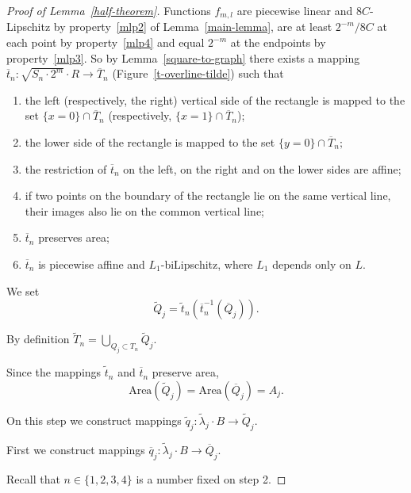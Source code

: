 \documentclass[12pt]{article}
\theoremstyle{definition}
\begin{document}
\begin{proof}[Proof of Lemma~\ref{half-theorem}]
Functions $f_{m,l}$ are piecewise linear and $8C$-Lipschitz by property~\ref{mlp2} of Lemma~\ref{main-lemma}, are at least $2^{-m}/8C$ at each point by property~\ref{mlp4} and equal $2^{-m}$ at the endpoints by property~\ref{mlp3}. So by Lemma~\ref{square-to-graph} there exists a mapping $\overline t_n: \sqrt{S_n\cdot 2^{m}}\cdot R\to \overline T_n$ (Figure~\ref{t-overline-tilde}) such that
\begin{enumerate}[label = \arabic*), ref = \arabic*)]
\item the left (respectively, the right) vertical side of the rectangle is mapped to the set $\{x = 0\}\cap \overline T_n$ (respectively, $\{x = 1\}\cap \overline T_n$);
\item the lower side of the rectangle is mapped to the set $\{y = 0\}\cap \overline T_n;$
\item the restriction of $\overline t_n$ on the left, on the right and on the lower sides are affine;
\item if two points on the boundary of the rectangle lie on the same vertical line, their images also lie on the common vertical line;
\item $\overline t_n$ preserves area;
\item $\overline t_n$ is piecewise affine and $L_1$-biLipschitz, where $L_1$ depends only on $L$.
\end{enumerate}

We set
$$
\widetilde Q_j = \widetilde t_n\left(\overline t_n^{-1}(\overline Q_j)\right).
$$

By definition $\widetilde T_n = \bigcup\limits_{Q_j\subset T_n}\widetilde Q_j$.

Since the mappings $\widetilde t_n$ and $\overline t_n$ preserve area,
$$
\mathrm{Area}(\widetilde Q_j) = \mathrm{Area}(\overline Q_j) = A_j.
$$

\smallskip
{} On this step we construct mappings $\widetilde q_{j}:\widetilde\lambda_{j}\cdot B \to\widetilde Q_j.$ 

First we construct mappings
$\overline q_{j}:\widetilde\lambda_{j}\cdot B \to\overline Q_j.$

Recall that $n\in\lbrace1,2,3,4\rbrace$ is a number fixed on step 2.


\end{proof}
\end{document}
